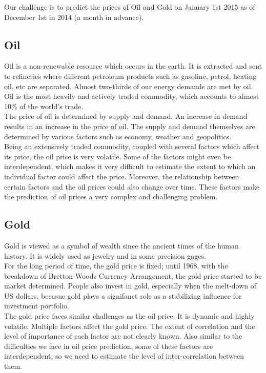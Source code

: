 \documentclass[runningheads]{llncs}
\begin{document}
Our challenge is to predict the prices of Oil and Gold on January 1st 2015 as of December 1st in 2014 (a month in advance). 

\subsection{Oil}

Oil is a non-renewable resource which occurs in the earth. It is extracted and sent to refineries where different petroleum products such as gasoline, petrol, heating oil, etc are separated. Almost two-thirds of our energy demands are met by oil. Oil is the most heavily and actively traded commodity, which accounts to almost 10\% of the world's trade.\\

\noindent The price of oil is determined by supply and demand. An increase in demand results in an increase in the price of oil. The supply and demand themselves are determined by various factors such as economy, weather and geopolitics. \\

\noindent Being an extensively traded commodity, coupled with several factors which affect its price, the oil price is very volatile. Some of the factors might even be interdependent, which makes it very difficult to estimate the extent to which an individual factor could affect the price. Moreover, the relationship between certain factors and the oil prices could also change over time. These factors make the prediction of oil prices a very complex and challenging problem.

\subsection{Gold}
Gold is viewed as a symbol of wealth since the ancient times of the human history. It is widely used as jewelry and in some precision gages. \\

\noindent For the long period of time, the gold price is fixed; until 1968, with the breakdown of Bretton Woods Currency Arrangement, the gold price started to be market determined. People also invest in gold, especially when the melt-down of US dollars, becasue gold plays a signifanct role as a stabilizing influence for investment portfolio. \\

\noindent The gold price faces similar challenges as the oil price. It is dynamic and highly volatile. Multiple factors affect the gold price. The extent of correlation and the level of importance of each factor are not clearly known. Also similar to the difficulties we face in oil price prediction, some of these factors are interdependent, so we need to estimate the level of inter-correlation between them. 
\end{document}
